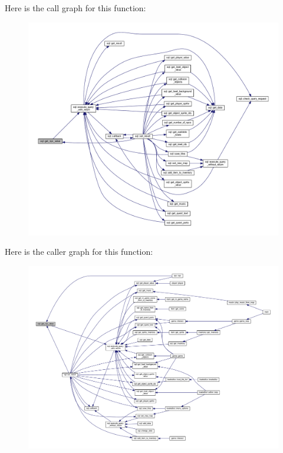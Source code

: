 Here is the call graph for this function\+:
\nopagebreak
\begin{figure}[H]
\begin{center}
\leavevmode
\includegraphics[width=350pt]{classsql_af04403a0cab4ee13a6f70b396e5b3a20_cgraph}
\end{center}
\end{figure}
Here is the caller graph for this function\+:
\nopagebreak
\begin{figure}[H]
\begin{center}
\leavevmode
\includegraphics[width=350pt]{classsql_af04403a0cab4ee13a6f70b396e5b3a20_icgraph}
\end{center}
\end{figure}
\mbox{\label{classsql_ae854372bac3fc5e681287e3cbf5b03de}} 
